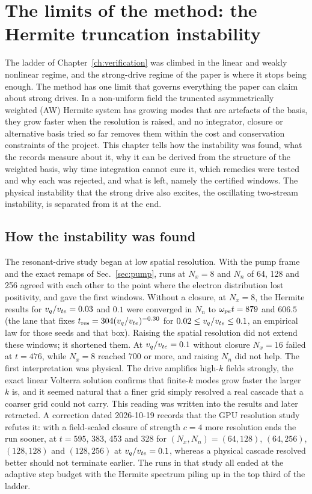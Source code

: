 \chapter{The limits of the method: the Hermite truncation instability}\label{ch:limits}

The ladder of Chapter~\ref{ch:verification} was climbed in the linear and weakly nonlinear regime, and the strong-drive regime of the paper is where it stops being enough. The method has one limit that governs everything the paper can claim about strong drives. In a non-uniform field the truncated asymmetrically weighted (AW) Hermite system has growing modes that are artefacts of the basis, they grow faster when the resolution is raised, and no integrator, closure or alternative basis tried so far removes them within the cost and conservation constraints of the project. This chapter tells how the instability was found, what the records measure about it, why it can be derived from the structure of the weighted basis, why time integration cannot cure it, which remedies were tested and why each was rejected, and what is left, namely the certified windows. The physical instability that the strong drive also excites, the oscillating two-stream instability, is separated from it at the end.

\section{How the instability was found}\label{sec:found}

The resonant-drive study began at low spatial resolution. With the pump frame and the exact remaps of Sec.~\ref{sec:pump}, runs at $N_x=8$ and $N_n$ of 64, 128 and 256 agreed with each other to the point where the electron distribution lost positivity, and gave the first windows. Without a closure, at $N_x=8$, the Hermite results for $v_q/v_{te}=0.03$ and $0.1$ were converged in $N_n$ to $\omega_{pe} t=879$ and $606.5$ (the lane that fixes $t_{\rm res}=304(v_q/v_{te})^{-0.30}$ for $0.02\le v_q/v_{te}\le0.1$, an empirical law for those seeds and that box). Raising the spatial resolution did not extend these windows; it shortened them. At $v_q/v_{te}=0.1$ without closure $N_x=16$ failed at $t=476$, while $N_x=8$ reached 700 or more, and raising $N_n$ did not help. The first interpretation was physical. The drive amplifies high-$k$ fields strongly, the exact linear Volterra solution confirms that finite-$k$ modes grow faster the larger $k$ is, and it seemed natural that a finer grid simply resolved a real cascade that a coarser grid could not carry. This reading was written into the results and later retracted. A correction dated 2026-10-19 records that the GPU resolution study refutes it: with a field-scaled closure of strength $c=4$ more resolution ends the run sooner, at $t=595$, 383, 453 and 328 for $(N_x,N_n)=(64,128)$, $(64,256)$, $(128,128)$ and $(128,256)$ at $v_q/v_{te}=0.1$, whereas a physical cascade resolved better should not terminate earlier. The runs in that study all ended at the adaptive step budget with the Hermite spectrum piling up in the top third of the ladder.

